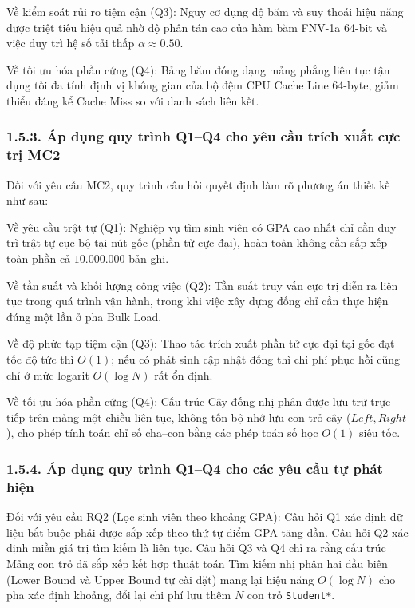 \documentclass[14pt,a4paper]{extarticle}
\begin{document}
Về kiểm soát rủi ro tiệm cận (Q3): Nguy cơ đụng độ băm và suy thoái hiệu năng được triệt tiêu hiệu quả nhờ độ phân tán cao của hàm băm FNV-1a 64-bit và việc duy trì hệ số tải thấp $\alpha \approx 0.50$.

Về tối ưu hóa phần cứng (Q4): Bảng băm đóng dạng mảng phẳng liên tục tận dụng tối đa tính định vị không gian của bộ đệm CPU Cache Line 64-byte, giảm thiểu đáng kể Cache Miss so với danh sách liên kết.

\subsubsection*{1.5.3. Áp dụng quy trình Q1--Q4 cho yêu cầu trích xuất cực trị MC2}
{}

Đối với yêu cầu MC2, quy trình câu hỏi quyết định làm rõ phương án thiết kế như sau:

Về yêu cầu trật tự (Q1): Nghiệp vụ tìm sinh viên có GPA cao nhất chỉ cần duy trì trật tự cục bộ tại nút gốc (phần tử cực đại), hoàn toàn không cần sắp xếp toàn phần cả $10.000.000$ bản ghi.

Về tần suất và khối lượng công việc (Q2): Tần suất truy vấn cực trị diễn ra liên tục trong quá trình vận hành, trong khi việc xây dựng đống chỉ cần thực hiện đúng một lần ở pha Bulk Load.

Về độ phức tạp tiệm cận (Q3): Thao tác trích xuất phần tử cực đại tại gốc đạt tốc độ tức thì $O(1)$; nếu có phát sinh cập nhật đống thì chi phí phục hồi cũng chỉ ở mức logarit $O(\log N)$ rất ổn định.

Về tối ưu hóa phần cứng (Q4): Cấu trúc Cây đống nhị phân được lưu trữ trực tiếp trên mảng một chiều liên tục, không tốn bộ nhớ lưu con trỏ cây ($Left, Right$), cho phép tính toán chỉ số cha--con bằng các phép toán số học $O(1)$ siêu tốc.

\subsubsection*{1.5.4. Áp dụng quy trình Q1--Q4 cho các yêu cầu tự phát hiện}
{}

Đối với yêu cầu RQ2 (Lọc sinh viên theo khoảng GPA): Câu hỏi Q1 xác định dữ liệu bắt buộc phải được sắp xếp theo thứ tự điểm GPA tăng dần. Câu hỏi Q2 xác định miền giá trị tìm kiếm là liên tục. Câu hỏi Q3 và Q4 chỉ ra rằng cấu trúc Mảng con trỏ đã sắp xếp kết hợp thuật toán Tìm kiếm nhị phân hai đầu biên (Lower Bound và Upper Bound tự cài đặt) mang lại hiệu năng $O(\log N)$ cho pha xác định khoảng, đổi lại chi phí lưu thêm $N$ con trỏ \texttt{Student*}.
\end{document}
